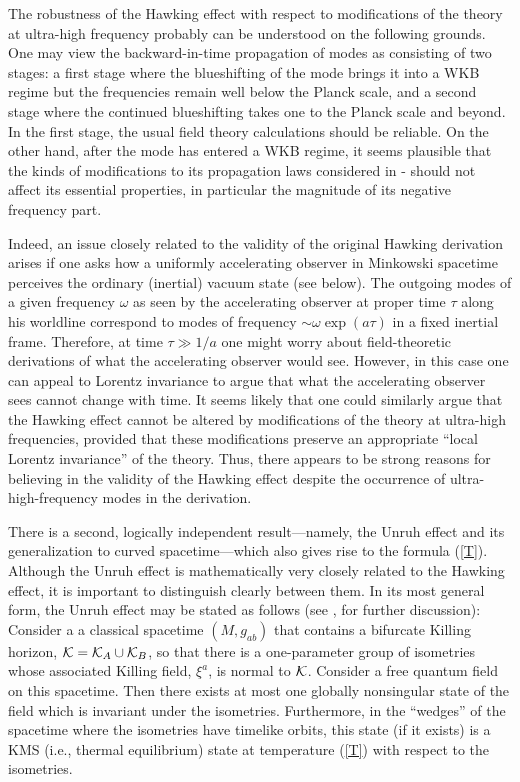 \documentclass[12pt]{article}
\begin{document}
The robustness of the Hawking effect with respect to modifications of
the theory at ultra-high frequency probably can be understood on the
following grounds. One may view the backward-in-time propagation of
modes as consisting of two stages: a first stage where the
blueshifting of the mode brings it into a WKB regime but the
frequencies remain well below the Planck scale, and a second stage
where the continued blueshifting takes one to the Planck scale and
beyond. In the first stage, the usual field theory calculations should
be reliable. On the other hand, after the mode has entered a WKB
regime, it seems plausible that the kinds of modifications to its
propagation laws considered in \cite{u3}-\cite{jm} should not affect
its essential properties, in particular the magnitude of its negative
frequency part.

Indeed, an issue closely related to the validity of the original
Hawking derivation arises if one asks how a uniformly accelerating
observer in Minkowski spacetime perceives the ordinary (inertial)
vacuum state (see below). The outgoing modes of a given frequency
$\omega$ as seen by the accelerating observer at proper time $\tau$
along his worldline correspond to modes of frequency $\sim \omega
\exp(a \tau)$ in a fixed inertial frame. Therefore, at time $\tau \gg
1/a$ one might worry about field-theoretic derivations of what the
accelerating observer would see. However, in this case one can appeal
to Lorentz invariance to argue that what the accelerating observer
sees cannot change with time. It seems likely that one could similarly
argue that the Hawking effect cannot be altered by modifications of
the theory at ultra-high frequencies, provided that these
modifications preserve an appropriate ``local Lorentz invariance'' of
the theory. Thus, there appears to be strong reasons for believing in
the validity of the Hawking effect despite the occurrence of
ultra-high-frequency modes in the derivation.

There is a second, logically independent result---namely, the Unruh
effect \cite{u1} and its generalization to curved spacetime---which
also gives rise to the formula (\ref{T}). Although the Unruh effect is
mathematically very closely related to the Hawking effect, it is
important to distinguish clearly between them.  In its most general
form, the Unruh effect may be stated as follows (see \cite{kw},
\cite{w4} for further discussion): Consider a a classical spacetime
$(M, g_{ab})$ that contains a bifurcate Killing horizon, ${\cal K} =
{\cal K}_A \cup {\cal K}_B$, so that there is a one-parameter group of
isometries whose associated Killing field, $\xi^a$, is normal to
${\cal K}$. Consider a free quantum field on this spacetime. Then
there exists at most one globally nonsingular state of the field which
is invariant under the isometries. Furthermore, in the ``wedges'' of
the spacetime where the isometries have timelike orbits, this state
(if it exists) is a KMS (i.e., thermal equilibrium) state at
temperature (\ref{T}) with respect to the isometries.
\end{document}
